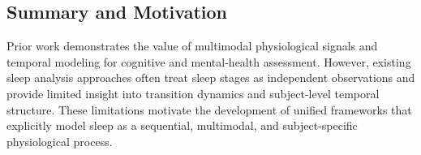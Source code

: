 \documentclass[10pt]{cai26}
\begin{document}
\subsection{Summary and Motivation}

Prior work demonstrates the value of multimodal physiological signals and temporal modeling for cognitive and mental-health assessment. However, existing sleep analysis approaches often treat sleep stages as independent observations and provide limited insight into transition dynamics and subject-level temporal structure. These limitations motivate the development of unified frameworks that explicitly model sleep as a sequential, multimodal, and subject-specific physiological process.

\printbibliography[heading=subbibintoc]
\end{document}
